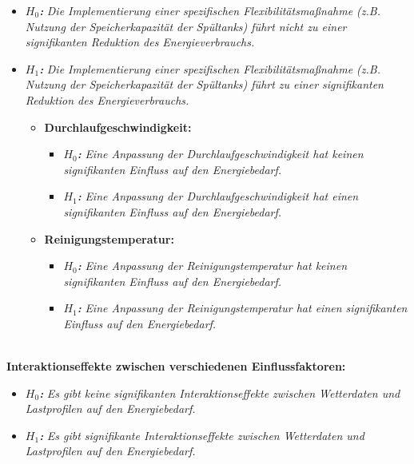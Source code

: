 \begin{itemize}[label={--}]
	\item \textbf{\textit{$H_0$:}} \textit{Die Implementierung einer spezifischen Flexibilitätsmaßnahme (z.B. Nutzung der Speicherkapazität der Spültanks) führt nicht zu einer signifikanten Reduktion des Energieverbrauchs.}
	\item \textbf{\textit{$H_1$:}} \textit{Die Implementierung einer spezifischen Flexibilitätsmaßnahme (z.B. Nutzung der Speicherkapazität der Spültanks) führt zu einer signifikanten Reduktion des Energieverbrauchs.}\\
	\begin{itemize}
		\item \textbf{Durchlaufgeschwindigkeit:}
		\begin{itemize}
			\item \textbf{\textit{$H_0$:}} \textit{Eine Anpassung der Durchlaufgeschwindigkeit hat keinen signifikanten Einfluss auf den Energiebedarf.}
			\item \textbf{\textit{$H_1$:}} \textit{Eine Anpassung der Durchlaufgeschwindigkeit hat einen signifikanten Einfluss auf den Energiebedarf.}\\
		\end{itemize}
		\item \textbf{Reinigungstemperatur:}
		\begin{itemize}
			\item \textbf{\textit{$H_0$:}} \textit{Eine Anpassung der Reinigungstemperatur hat keinen signifikanten Einfluss auf den Energiebedarf.}
			\item \textbf{\textit{$H_1$:}} \textit{Eine Anpassung der Reinigungstemperatur hat einen signifikanten Einfluss auf den Energiebedarf.}\\\\
		\end{itemize}
	\end{itemize}
\end{itemize}

\textbf{Interaktionseffekte zwischen verschiedenen Einflussfaktoren:}
\begin{itemize}[label={--}]
	\item \textbf{\textit{$H_0$:}} \textit{Es gibt keine signifikanten Interaktionseffekte zwischen Wetterdaten und Lastprofilen auf den Energiebedarf.}
	\item \textbf{\textit{$H_1$:}} \textit{Es gibt signifikante Interaktionseffekte zwischen Wetterdaten und Lastprofilen auf den Energiebedarf.}\\\\
\end{itemize}

